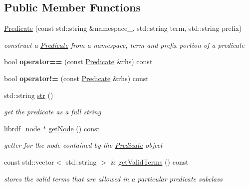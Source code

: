 \subsection*{Public Member Functions}
\begin{DoxyCompactItemize}
\item 
\hyperlink{classomexmeta_1_1Predicate_ad5a91eb29204202d2f18816d09677622}{Predicate} (const std\+::string \&namespace\+\_\+, std\+::string term, std\+::string prefix)
\begin{DoxyCompactList}\small\item\em construct a \hyperlink{classomexmeta_1_1Predicate}{Predicate} from a namespace, term and prefix portion of a predicate \end{DoxyCompactList}\item 
\mbox{\label{classomexmeta_1_1Predicate_a5db1e6150f8cfd7605e82996e2aebb50}} 
bool {\bfseries operator==} (const \hyperlink{classomexmeta_1_1Predicate}{Predicate} \&rhs) const
\item 
\mbox{\label{classomexmeta_1_1Predicate_a7bf4b8769eb9801eb26cc976723b56f2}} 
bool {\bfseries operator!=} (const \hyperlink{classomexmeta_1_1Predicate}{Predicate} \&rhs) const
\item 
std\+::string \hyperlink{classomexmeta_1_1Predicate_a9d51ebf565f39fb4d6d4f58c1b030edf}{str} ()
\begin{DoxyCompactList}\small\item\em get the predicate as a full string \end{DoxyCompactList}\item 
librdf\+\_\+node $\ast$ \hyperlink{classomexmeta_1_1Predicate_a144efc75a923b9d85b9f8eaccf0400bb}{get\+Node} () const
\begin{DoxyCompactList}\small\item\em getter for the node contained by the \hyperlink{classomexmeta_1_1Predicate}{Predicate} object \end{DoxyCompactList}\item 
const std\+::vector$<$ std\+::string $>$ \& \hyperlink{classomexmeta_1_1Predicate_aee19b8fc8b21f8e5ffd5b64691e1e530}{get\+Valid\+Terms} () const
\begin{DoxyCompactList}\small\item\em stores the valid terms that are allowed in a particular predicate subclass \end{DoxyCompactList}\item 

\end{DoxyCompactItemize}
